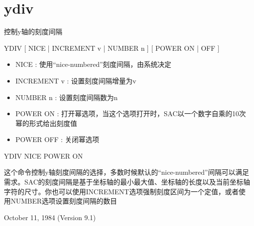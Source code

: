 \section{ydiv}
\label{cmd:ydiv}

控制y轴的刻度间隔

YDIV [ NICE | INCREMENT v | NUMBER n ] [ POWER ON | OFF ]

\begin{itemize}
\item NICE : 使用``nice-numbered''刻度间隔，由系统决定 
\item INCREMENT v : 设置刻度间隔增量为v  
\item NUMBER n : 设置刻度间隔数为n  
\item POWER ON : 打开幂选项，当这个选项打开时，SAC以一个数字自乘的10次幂的形式给出刻度值 
\item POWER OFF : 关闭幂选项 
\end{itemize}

YDIV NICE POWER ON

这个命令控制y轴刻度间隔的选择，多数时候默认的``nice-numbered''间隔可以满足需求。SAC的刻度间隔是基于坐标轴的最小最大值、坐标轴的长度以及当前坐标轴字符的尺寸。你也可以使用INCREMENT选项强制刻度区间为一个定值，或者使用NUMBER选项设置刻度间隔的数目

October 11, 1984 (Version 9.1)
